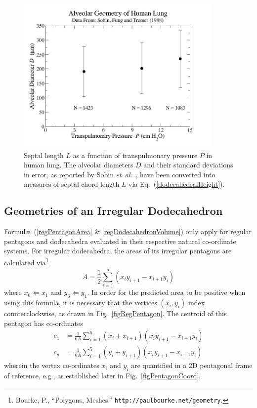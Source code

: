 \begin{figure}
	\centering
	\includegraphics[width=10cm]{figures/septalLength.jpg}
	\caption{Septal length $L$ as a function of transpulmonary pressure $P$ in human lung.  The alveolar diameters $D$ and their standard deviations in error, as reported by Sobin \textit{et~al}.\ \cite{Sobinetal88}, have been converted into measures of septal chord length $L$ via Eq.~(\ref{dodecahedralHeight}).}
	\label{septalLengthFig}
\end{figure}

\subsection{Geometries of an Irregular Dodecahedron}
\label{sec:geometries}

Formul\ae\ (\ref{regPentagonArea} \& \ref{regDodecahedronVolume}) only apply for regular pentagons and dodecahedra evaluated in their respective natural co-ordinate systems.  For irregular dodecahedra, the areas of its irregular pentagons are calculated via\footnote{
	Bourke, P., ``Polygons, Meshes.'' \texttt{http://paulbourke.net/geometry}.
}
\begin{equation}
	A = \frac{1}{2} \sum_{i=1}^5 ( x_i y_{i+1} - x_{i+1} y_i)
	\label{irregularPentagonArea}
\end{equation}
where $x_6 \Leftarrow x_1$ and $y_6 \Leftarrow y_1$.  In order for the predicted area to be positive when using this formula, it is necessary that the vertices $(x_i , y_i)$ index counterclockwise, as drawn in Fig.~\ref{figRegPentagon}.  The centroid of this pentagon has co-ordinates\footnotemark[\value{footnote}]
\begin{subequations}
	\label{centroidPentagon}
	\begin{align}
		c_x & = \frac{1}{6 A} \sum_{i=1}^5 (x_i + x_{i+1})
			( x_i y_{i+1} - x_{i+1} y_i) \\
		c_y & = \frac{1}{6 A} \sum_{i=1}^5 (y_i + y_{i+1})
		( x_i y_{i+1} - x_{i+1} y_i)
	\end{align}
\end{subequations}
wherein the vertex co-ordinates $x_i$ and $y_i$ are quantified in a 2D pentagonal frame of reference, e.g., as established later in Fig.~\ref{figPentagonCoord}.

